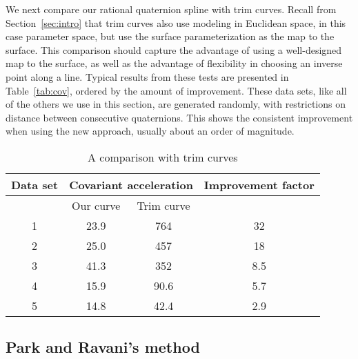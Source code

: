 We next compare our rational quaternion spline with trim curves.
Recall from Section~\ref{sec:intro} that trim curves also use modeling 
in Euclidean space, in this case parameter space, 
but use the surface parameterization as the map to the surface.
This comparison should capture the advantage of using a well-designed map to the
surface, as well as the advantage of 
flexibility in choosing an inverse point along a line.
%
%
Typical results from these tests are presented in Table~\ref{tab:cov},
ordered by the amount of improvement.
These data sets, like all of the others we use in this section, 
are generated randomly, with restrictions on distance between consecutive
quaternions.
This shows the consistent improvement when using the new approach,
usually about an order of magnitude.

\begin{table}
\begin{tabular}{|c|c|c|c|}  	\hline
Data set & \multicolumn{2}{c|}{Covariant acceleration} & Improvement factor \\ \hline
	 & Our curve  & Trim curve & \\ \hline
1 & 23.9 & 764 & 32 \\ \hline
2 & 25.0 & 457 & 18 \\ \hline
3 & 41.3 & 352 & 8.5\\ \hline
4 & 15.9 & 90.6 & 5.7 \\ \hline
5 & 14.8 & 42.4 & 2.9 \\ \hline
\end{tabular}
\caption{A comparison with trim curves}
\label{tab:cov2}
\end{table}

\subsection{Park and Ravani's method}

